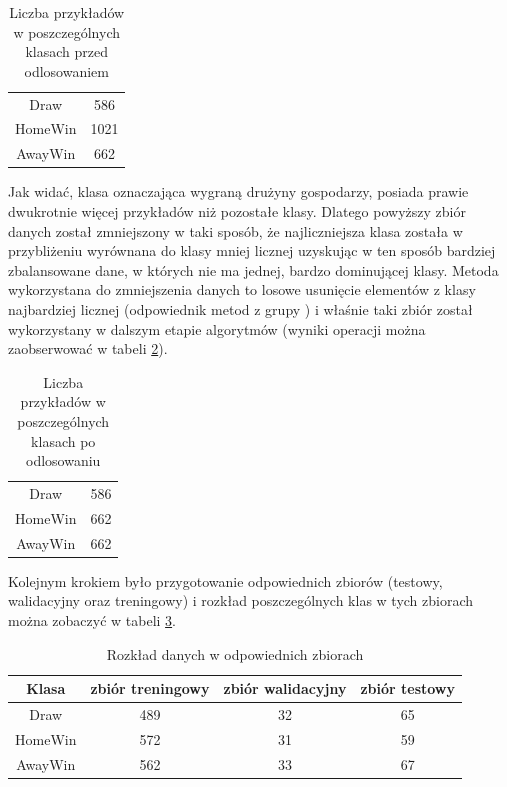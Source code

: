\begin{table}[H]
    \centering
    \caption{Liczba przykładów  w poszczególnych klasach przed odlosowaniem}
    \label{tab:przedOdlosowaniem}
    \begin{tabular}{| c  c |}
    \hline
         Draw & 586 \\
         HomeWin & 1021 \\
         AwayWin & 662 \\\hline
    \end{tabular}
\end{table}
Jak widać, klasa oznaczająca wygraną drużyny gospodarzy, posiada prawie dwukrotnie więcej przykładów niż pozostałe klasy. Dlatego powyższy zbiór danych został zmniejszony w taki sposób, że najliczniejsza klasa została w przybliżeniu wyrównana do klasy mniej licznej uzyskując w ten sposób bardziej zbalansowane dane, w których nie ma jednej, bardzo dominującej klasy. Metoda wykorzystana do zmniejszenia danych to losowe usunięcie elementów z klasy najbardziej licznej (odpowiednik metod z grupy ) i właśnie taki zbiór został wykorzystany w dalszym etapie algorytmów (wyniki operacji można zaobserwować w tabeli \ref{tab:poOdlosowaniu}). 

\begin{table}[H]
    \centering
    \caption{Liczba przykładów w poszczególnych klasach po odlosowaniu}
    \label{tab:poOdlosowaniu}
    \begin{tabular}{| c  c |}
    \hline
         Draw & 586 \\
         HomeWin & 662 \\
         AwayWin & 662 \\\hline
    \end{tabular}
\end{table}
Kolejnym krokiem było przygotowanie odpowiednich zbiorów (testowy, walidacyjny oraz treningowy) i rozkład poszczególnych klas w tych zbiorach można zobaczyć w tabeli \ref{tab:rozkłądDanych}.

\begin{table}[H]
\caption{Rozkład danych w odpowiednich zbiorach}
\label{tab:rozkłądDanych}
\centering
\begin{tabular}{| c | c c c |}
\hline
    Klasa & zbiór treningowy & zbiór walidacyjny & zbiór testowy \\ \hline
   Draw & 489 & 32 & 65 \\
   HomeWin & 572 & 31 & 59  \\
   AwayWin & 562 & 33 & 67 \\ \hline
\end{tabular}
\end{table}


